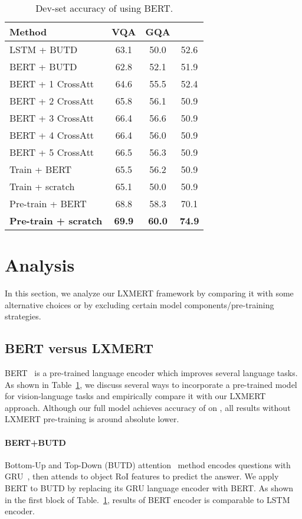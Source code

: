 \documentclass[11pt,a4paper]{article}
\newcommand\NLVR{}
\begin{document}
\begin{table}[]
\centering
\begin{tabular}{lccc}
\toprule
Method                      & VQA   & GQA   & \NLVR   \\
\midrule
LSTM + BUTD                 & 63.1  & 50.0  & 52.6 \\
BERT + BUTD                 & 62.8  & 52.1  & 51.9\\
\midrule
BERT + 1 CrossAtt           & 64.6  & 55.5  & 52.4 \\
BERT + 2 CrossAtt           & 65.8  & 56.1  & 50.9 \\
BERT + 3 CrossAtt           & 66.4  & 56.6  & 50.9 \\
BERT + 4 CrossAtt           & 66.4  & 56.0  & 50.9 \\
BERT + 5 CrossAtt           & 66.5  & 56.3  & 50.9 \\
\midrule
Train + BERT                & 65.5  & 56.2  & 50.9 \\
Train + scratch             & 65.1  & 50.0  & 50.9 \\
Pre-train + BERT            & 68.8  & 58.3  & 70.1  \\
\textbf{Pre-train + scratch}  & \textbf{69.9}  &\textbf{60.0} & \textbf{74.9}\\
\bottomrule
\end{tabular}
\vspace{-5pt}
\caption{Dev-set accuracy of using BERT. 
}
\label{table:bert}
\vspace{-5pt}
\end{table}
\section{Analysis}
In this section, we analyze our LXMERT framework by comparing it with some alternative choices or by excluding certain model components/pre-training strategies.
\subsection{BERT versus LXMERT} 
\label{sec:bert}
BERT~\cite{devlin2018bert} is a pre-trained language encoder which improves several language tasks.
As shown
in Table~\ref{table:bert}, we discuss several ways to incorporate a  pre-trained model for vision-language tasks and empirically compare it with our LXMERT approach. 
Although our full model achieves accuracy of  on , all results without LXMERT pre-training is around  absolute lower.
\paragraph{BERT+BUTD}
\label{sec:bert_butd}
Bottom-Up and Top-Down (BUTD) attention~\cite{anderson2018bottom} method encodes questions with GRU~\cite{chung2015gated}, then attends to object RoI features  to predict the answer.
We apply BERT to BUTD by replacing its GRU language encoder with BERT.
As shown in the first block of Table.~\ref{table:bert}, results of BERT encoder is comparable to LSTM encoder.
\end{document}

